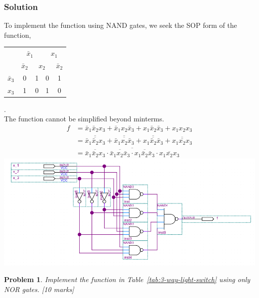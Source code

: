 \documentclass{article}
\newtheorem{prob}{Problem}
\newcommand{\bx}{\bar{x}}
\begin{document}
\subsubsection*{Solution}
To implement the function using NAND gates, we seek the SOP form of the
function,
\\
\begin{tabular}{c|c|c|c|c}
  \toprule
  & \multicolumn{2}{c|}{$\bx_1$} & \multicolumn{2}{c}{$x_1$}
  \\
  & $\bx_2$ & \multicolumn{2}{c|}{$x_2$} & $\bx_2$
  \\ \midrule
  $\bx_3$
  & 0 & 1 & 0 & 1
  \\
  $x_3$
  & 1 & 0 & 1 & 0
  \\\bottomrule
\end{tabular}.
\\
The function cannot be simplified beyond minterms.
\begin{align*}
  f &= \bx_1 \bx_2 x_3 + \bx_1 x_2 \bx_3 + x_1 \bx_2 \bx_3 + x_1 x_2 x_3
  \\
    &= \overline{\overline{\bx_1 \bx_2 x_3}} + \overline{\overline{\bx_1 x_2 \bx_3}} + \overline{\overline{x_1 \bx_2 \bx_3}} + \overline{\overline{x_1 x_2 x_3}}
  \\
    &= \overline{\overline{\bx_1 \bx_2 x_3} \cdot {\overline{\bx_1 x_2 \bx_3}} \cdot {\overline{x_1 \bx_2 \bx_3}} \cdot {\overline{x_1 x_2 x_3}}}
\end{align*}
\includegraphics[width=\linewidth]{files/hw2p3.png}

\begin{prob}
 Implement the function in Table~\ref{tab:3-way-light-switch} using only NOR
 gates. [10 marks]
\end{prob}
\end{document}
